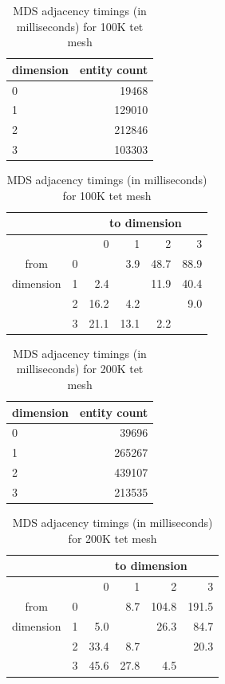 \begin{table}
\caption{MDS adjacency timings (in milliseconds) for 100K tet mesh}
\label{tab:mds_adj_100}
\begin{center}
\begin{tabular}{l|r|}
dimension & entity count \\\hline
0 & 19468 \\
1 & 129010 \\
2 & 212846 \\
3 & 103303 \\
\end{tabular}
\begin{tabular}{|c|r|r r r r}
               &   & \multicolumn{4}{c}{to dimension} \\\hline
               &   &    0 &    1 &    2 &   3  \\\hline
from           & 0 &      &  3.9 & 48.7 & 88.9 \\
dimension      & 1 &  2.4 &      & 11.9 & 40.4 \\
               & 2 & 16.2 &  4.2 &      &  9.0 \\
               & 3 & 21.1 & 13.1 &  2.2 &      \\
\end{tabular}
\end{center}
\end{table}

\begin{table}
\caption{MDS adjacency timings (in milliseconds) for 200K tet mesh}
\label{tab:mds_adj_200}
\begin{center}
\begin{tabular}{l|r|}
dimension & entity count \\\hline
0 & 39696  \\
1 & 265267 \\
2 & 439107 \\
3 & 213535 \\
\end{tabular}
\begin{tabular}{|c|r|r r r r}
               &   & \multicolumn{4}{c}{to dimension} \\\hline
               &   &    0 &    1 &     2 &     3 \\\hline
from           & 0 &      &  8.7 & 104.8 & 191.5 \\
dimension      & 1 &  5.0 &      &  26.3 &  84.7 \\
               & 2 & 33.4 &  8.7 &       &  20.3 \\
               & 3 & 45.6 & 27.8 &   4.5 &       \\
\end{tabular}
\end{center}
\end{table}

